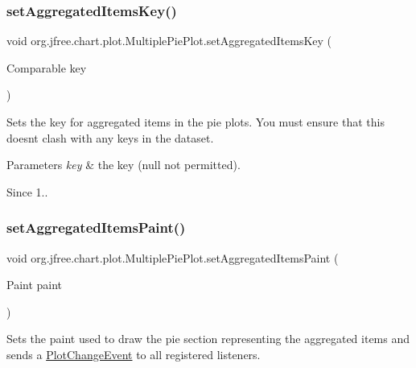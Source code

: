 \subsubsection{\texorpdfstring{set\+Aggregated\+Items\+Key()}{setAggregatedItemsKey()}}
{\footnotesize\ttfamily void org.\+jfree.\+chart.\+plot.\+Multiple\+Pie\+Plot.\+set\+Aggregated\+Items\+Key (\begin{DoxyParamCaption}\item[{Comparable}]{key }\end{DoxyParamCaption})}

Sets the key for aggregated items in the pie plots. You must ensure that this doesn\textquotesingle{}t clash with any keys in the dataset.


\begin{DoxyParams}{Parameters}
{\em key} & the key ({\ttfamily null} not permitted).\\
\hline
\end{DoxyParams}
\begin{DoxySince}{Since}
1.. 
\end{DoxySince}
\mbox{\label{classorg_1_1jfree_1_1chart_1_1plot_1_1_multiple_pie_plot_a45fa376d4023c45b5ecd8ce011fe8dd8}} 
\subsubsection{\texorpdfstring{set\+Aggregated\+Items\+Paint()}{setAggregatedItemsPaint()}}
{\footnotesize\ttfamily void org.\+jfree.\+chart.\+plot.\+Multiple\+Pie\+Plot.\+set\+Aggregated\+Items\+Paint (\begin{DoxyParamCaption}\item[{Paint}]{paint }\end{DoxyParamCaption})}

Sets the paint used to draw the pie section representing the aggregated items and sends a \mbox{\hyperlink{}{Plot\+Change\+Event}} to all registered listeners.


